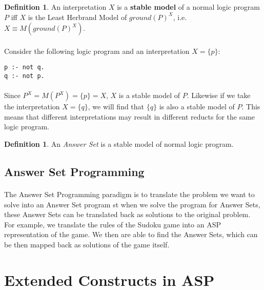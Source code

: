 \documentclass{article}
\theoremstyle{plain}
\theoremstyle{definition}
\newtheorem{defn}[thm]{Definition} %
\begin{document}
\begin{multicols}{2}
\begin{defn}An interpretation $X$ is a \textbf{stable model} of a normal logic program $P$ iff $X$ is the Least Herbrand Model of $ground(P)^X$, i.e. $X \equiv M(ground(P)^X)$.\end{defn}

\paragraph{} Consider the following logic program and an interpretation $X = \{p\}$:

\begin{lstlisting}
p :- not q.
q :- not p.
\end{lstlisting}

\paragraph{} Since $P^X = M(P^X) = \{p\} = X$, $X$ is a stable model of $P$. Likewise if we take the interpretation $X = \{q\}$, we will find that $\{q\}$ is also a stable model of $P$. This means that different interpretations may result in different reducts for the same logic program.

\begin{defn}An \textit{Answer Set} is a stable model of normal logic program.\end{defn}

\subsection{Answer Set Programming}

\paragraph{} The Answer Set Programming paradigm is to translate the problem we want to solve into an Answer Set program st when we solve the program for Answer Sets, these Answer Sets can be translated back as solutions to the original problem. For example, we translate the rules of the Sudoku game into an ASP representation of the game. We then are able to find the Answer Sets, which can be then mapped back as solutions of the game itself.

\section{Extended Constructs in ASP}\label{sec:ASPExtendedConstructs}


\end{multicols}
\end{document}
